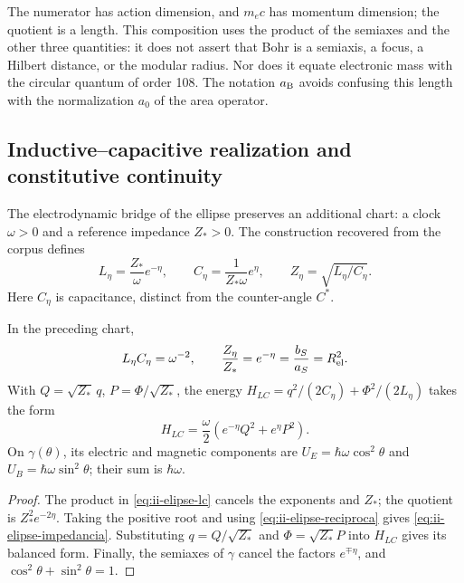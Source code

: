 The numerator has action dimension, and \(m_ec\) has momentum dimension;
the quotient is a length. This composition uses the product of
the semiaxes and the other three quantities: it does not assert that Bohr is a semiaxis,
a focus, a Hilbert distance, or the modular radius. Nor does it equate
electronic mass with the circular quantum of order 108. The notation
\(a_{\rm B}\) avoids confusing this length with the normalization
\(a_0\) of the area operator.

\subsection{Inductive--capacitive realization and constitutive continuity}
\label{sec:ii-elipse-lc}

The electrodynamic bridge of the ellipse preserves an additional chart:
a clock \(\omega>0\) and a reference impedance \(Z_*>0\).
The construction recovered from the corpus defines
\begin{equation}
 L_\eta=\frac{Z_*}{\omega}e^{-\eta},\qquad
 C_\eta=\frac{1}{Z_*\omega}e^\eta,
 \qquad Z_\eta=\sqrt{L_\eta/C_\eta}.
 \label{eq:ii-elipse-lc}
\end{equation}
Here \(C_\eta\) is capacitance, distinct from the counter-angle \(C^*\).
\begin{proposition}
\label{prop:ii-elipse-lc}
In the preceding chart,
\begin{equation}
 L_\eta C_\eta=\omega^{-2},\qquad
 \frac{Z_\eta}{Z_*}=e^{-\eta}
 =\frac{b_S}{a_S}=R_{\rm el}^{2}.
 \label{eq:ii-elipse-impedancia}
\end{equation}
With \(Q=\sqrt{Z_*}\,q\), \(P=\Phi/\sqrt{Z_*}\), the energy
\(H_{LC}=q^2/(2C_\eta)+\Phi^2/(2L_\eta)\) takes the form
\[
 H_{LC}=\frac\omega2(e^{-\eta}Q^2+e^\eta P^2).
\]
On \(\gamma(\theta)\), its electric and magnetic components are
\(U_E=\hbar\omega\cos^2\theta\) and
\(U_B=\hbar\omega\sin^2\theta\); their sum is \(\hbar\omega\).
\end{proposition}
\begin{proof}
The product in \eqref{eq:ii-elipse-lc} cancels the exponents and
\(Z_*\); the quotient is \(Z_*^2e^{-2\eta}\). Taking the positive
root and using \eqref{eq:ii-elipse-reciproca} gives
\eqref{eq:ii-elipse-impedancia}. Substituting \(q=Q/\sqrt{Z_*}\)
and \(\Phi=\sqrt{Z_*}P\) into \(H_{LC}\) gives its balanced form.
Finally, the semiaxes of \(\gamma\) cancel the factors
\(e^{\mp\eta}\), and \(\cos^2\theta+\sin^2\theta=1\).
\end{proof}


